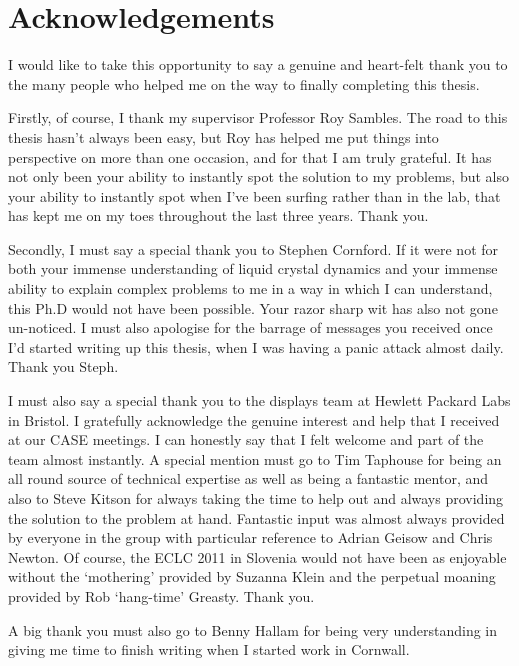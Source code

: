 \tableofcontents

\section{Acknowledgements}
I would like to take this opportunity to say a genuine and heart-felt thank you to the many people who helped me on the way to finally completing this thesis.

Firstly, of course, I thank my supervisor Professor Roy Sambles. The road to this thesis hasn't always been easy, but Roy has helped me put things into perspective on more than one occasion, and for that I am truly grateful. It has not only been your ability to instantly spot the solution to my problems, but also your ability to instantly spot when I've been surfing rather than in the lab, that has kept me on my toes throughout the last three years. Thank you.

Secondly, I must say a special thank you to Stephen Cornford. If it were not for both your immense understanding of liquid crystal dynamics and your immense ability to explain complex problems to me in a way in which I can understand, this Ph.D would not have been possible. Your razor sharp wit has also not gone un-noticed. I must also apologise for the barrage of messages you received once I'd started writing up this thesis, when I was having a panic attack almost daily. Thank you Steph.

I must also say a special thank you to the displays team at Hewlett Packard Labs in Bristol. I gratefully acknowledge the genuine interest and help that I received at our CASE meetings. I can honestly say that I felt welcome and part of the team almost instantly. A special mention must go to Tim Taphouse for being an all round source of technical expertise as well as being a fantastic mentor, and also to Steve Kitson for always taking the time to help out and always providing the solution to the problem at hand. Fantastic input was almost always provided by everyone in the group with particular reference to Adrian Geisow and Chris Newton. Of course, the ECLC 2011 in Slovenia would not have been as enjoyable without the `mothering' provided by Suzanna Klein and the perpetual moaning provided by Rob `hang-time' Greasty. Thank you.

A big thank you must also go to Benny Hallam for being very understanding in giving me time to finish writing when I started work in Cornwall.

